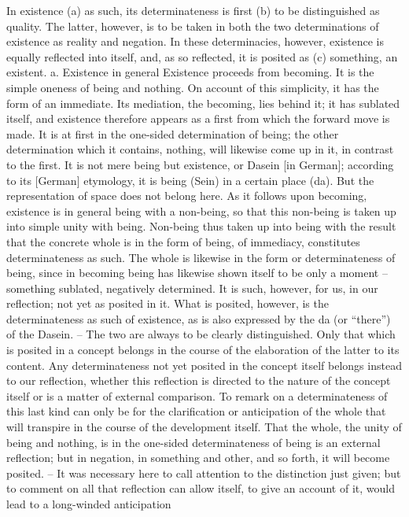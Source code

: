 In existence (a) as such, its determinateness is first (b) to be distinguished as
quality. The latter, however, is to be taken in both the two determinations of
existence as reality and negation. In these determinacies, however, existence
is equally reflected into itself, and, as so reflected, it is posited as (c)
something, an existent.
a. Existence in general
Existence proceeds from becoming. It is the simple oneness of being and
nothing. On account of this simplicity, it has the form of an immediate. Its
mediation, the becoming, lies behind it; it has sublated itself, and existence
therefore appears as a first from which the forward move is made. It is
at first in the one-sided determination of being; the other determination
which it contains, nothing, will likewise come up in it, in contrast to the
first.
It is not mere being but existence, or Dasein [in German]; according to
its [German] etymology, it is being (Sein) in a certain place (da). But the
representation of space does not belong here. As it follows upon becoming,
existence is in general being with a non-being, so that this non-being is taken
up into simple unity with being. Non-being thus taken up into being with
the result that the concrete whole is in the form of being, of immediacy,
constitutes determinateness as such.
The whole is likewise in the form or determinateness of being, since in
becoming being has likewise shown itself to be only a moment – something
sublated, negatively determined. It is such, however, for us, in our reflection;
not yet as posited in it. What is posited, however, is the determinateness as
such of existence, as is also expressed by the da (or “there”) of the Dasein. –
The two are always to be clearly distinguished. Only that which is posited in
a concept belongs in the course of the elaboration of the latter to its content.
Any determinateness not yet posited in the concept itself belongs instead to
our reflection, whether this reflection is directed to the nature of the concept
itself or is a matter of external comparison. To remark on a determinateness
of this last kind can only be for the clarification or anticipation of the whole
that will transpire in the course of the development itself. That the whole,
the unity of being and nothing, is in the one-sided determinateness of being
is an external reflection; but in negation, in something and other, and so
forth, it will become posited. – It was necessary here to call attention to
the distinction just given; but to comment on all that reflection can allow
itself, to give an account of it, would lead to a long-winded anticipation
